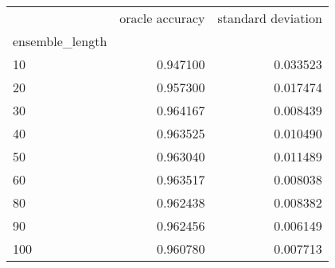 \begin{tabular}{lrr}
\toprule
{} &  oracle accuracy &  standard deviation \\
ensemble\_length &                  &                     \\
\midrule
10              &         0.947100 &            0.033523 \\
20              &         0.957300 &            0.017474 \\
30              &         0.964167 &            0.008439 \\
40              &         0.963525 &            0.010490 \\
50              &         0.963040 &            0.011489 \\
60              &         0.963517 &            0.008038 \\
80              &         0.962438 &            0.008382 \\
90              &         0.962456 &            0.006149 \\
100             &         0.960780 &            0.007713 \\
\bottomrule
\end{tabular}
